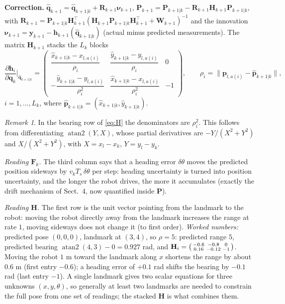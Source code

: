 \documentclass[11pt,a4paper]{article}
\newcommand{\Ts}{T_s}
\newcommand{\hq}{\hat{\boldsymbol{q}}}
\newcommand{\bq}{\boldsymbol{q}}
\newcommand{\by}{\boldsymbol{y}}
\newcommand{\bnu}{\boldsymbol{\nu}}
\newcommand{\mF}{\mathbf{F}}
\newcommand{\mH}{\mathbf{H}}
\newcommand{\mP}{\mathbf{P}}
\newcommand{\mR}{\mathbf{R}}
\newcommand{\mW}{\mathbf{W}}
\newcommand{\tp}{^{\top}}
\DeclareMathOperator{\atantwo}{atan2}
\theoremstyle{plain}
\theoremstyle{definition}
\theoremstyle{remark}
\newtheorem*{remark}{Remark}
\begin{document}
\noindent\textbf{Correction.} $\hq_{k+1}=\hq_{k+1|k}+\mR_{k+1}\bnu_{k+1}$, $\mP_{k+1}=\mP_{k+1|k}-\mR_{k+1}\mH_{k+1}\mP_{k+1|k}$, with
$\mR_{k+1}=\mP_{k+1|k}\mH_{k+1}\tp(\mH_{k+1}\mP_{k+1|k}\mH_{k+1}\tp+\mW_{k+1})^{-1}$ and the innovation
$\bnu_{k+1}=\by_{k+1}-\boldsymbol h_{k+1}(\hq_{k+1|k})$ (actual minus predicted measurements). The matrix $\mH_{k+1}$ stacks the $L_k$ blocks
\begin{equation}\label{eq:H}
\frac{\partial\boldsymbol h_i}{\partial\bq_k}\Big|_{\hq_{k+1|k}}=
\begin{pmatrix}
\dfrac{\hat x_{k+1|k}-x_{l,a(i)}}{\rho_i} & \dfrac{\hat y_{k+1|k}-y_{l,a(i)}}{\rho_i} & 0\\[8pt]
-\dfrac{\hat y_{k+1|k}-y_{l,a(i)}}{\rho_i^2} & \dfrac{\hat x_{k+1|k}-x_{l,a(i)}}{\rho_i^2} & -1
\end{pmatrix},\qquad \rho_i=\|\boldsymbol p_{l,a(i)}-\hat{\boldsymbol p}_{k+1|k}\|,
\end{equation}
$i=1,\dots,L_k$, where $\hat{\boldsymbol p}_{k+1|k}=(\hat x_{k+1|k},\hat y_{k+1|k})$.

\begin{remark}
In the bearing row of \eqref{eq:H} the denominators are $\rho_i^2$. This follows from differentiating $\atantwo(Y,X)$, whose partial derivatives are
$-Y/(X^2+Y^2)$ and $X/(X^2+Y^2)$, with $X=x_{l}-x_k$, $Y=y_{l}-y_k$.
\end{remark}

\begin{intuition}
\emph{Reading $\mF_k$.} The third column says that a heading error $\delta\theta$ moves the predicted position sideways by
$v_k\Ts\,\delta\theta$ per step: heading uncertainty is turned into position uncertainty, and the longer the robot drives, the more
it accumulates (exactly the drift mechanism of Sect.~4, now quantified inside $\mP$).

\emph{Reading $\mH$.} The first row is the unit vector pointing from the landmark to the robot: moving the robot directly away from the landmark increases the range
at rate $1$, moving sideways does not change it (to first order). \emph{Worked numbers:} predicted pose $(0,0,0)$, landmark at $(3,4)$, so $\rho=5$:
predicted range $5$, predicted bearing $\atantwo(4,3)-0=0.927$ rad, and
$\mH_i=\begin{psmallmatrix}-0.6&-0.8&0\\0.16&-0.12&-1\end{psmallmatrix}$. Moving the robot $1$ m toward the landmark along $x$ shortens the range by about $0.6$ m
(first entry $-0.6$); a heading error of $+0.1$ rad shifts the bearing by $-0.1$ rad (last entry $-1$).
A single landmark gives two scalar equations for three unknowns $(x,y,\theta)$, so generally at least two landmarks are needed to constrain the full pose from one set of readings;
the stacked $\mH$ is what combines them.
\end{intuition}
\end{document}
